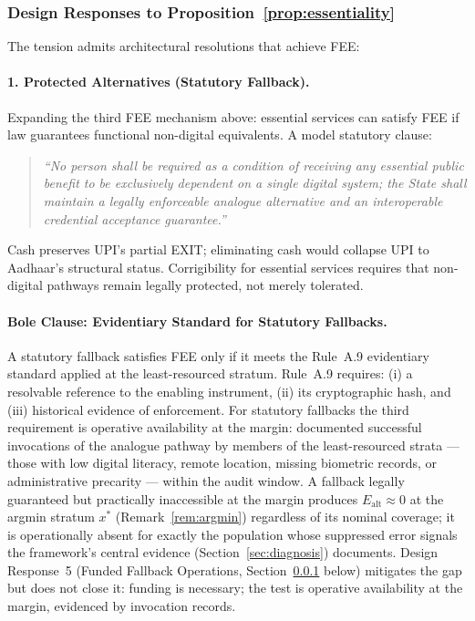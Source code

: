 \documentclass{article}
\begin{document}
\subsubsection{Design Responses to Proposition~\ref{prop:essentiality}}
\label{subsubsec:arch-responses}

The tension admits architectural resolutions that achieve FEE:

\paragraph{1. Protected Alternatives (Statutory Fallback).} Expanding the third FEE mechanism above: essential services can satisfy FEE if law guarantees functional non-digital equivalents. A model statutory clause:

\begin{quote}
\textit{``No person shall be required as a condition of receiving any essential public benefit to be exclusively dependent on a single digital system; the State shall maintain a legally enforceable analogue alternative and an interoperable credential acceptance guarantee.''}
\end{quote}

Cash preserves UPI's partial EXIT; eliminating cash would collapse UPI to Aadhaar's structural status. Corrigibility for essential services requires that non-digital pathways remain legally protected, not merely tolerated.

\paragraph{Bole Clause: Evidentiary Standard for Statutory Fallbacks.} A statutory fallback satisfies FEE only if it meets the Rule~A.9 evidentiary standard applied at the least-resourced stratum. Rule~A.9 requires: (i) a resolvable reference to the enabling instrument, (ii) its cryptographic hash, and (iii) historical evidence of enforcement. For statutory fallbacks the third requirement is operative availability at the margin: documented successful invocations of the analogue pathway by members of the least-resourced strata --- those with low digital literacy, remote location, missing biometric records, or administrative precarity --- within the audit window. A fallback legally guaranteed but practically inaccessible at the margin produces $E_{\text{alt}} \approx 0$ at the argmin stratum $x^*$ (Remark~\ref{rem:argmin}) regardless of its nominal coverage; it is operationally absent for exactly the population whose suppressed error signals the framework's central evidence (Section~\ref{sec:diagnosis}) documents. Design Response~5 (Funded Fallback Operations, Section~\ref{subsubsec:arch-responses} below) mitigates the gap but does not close it: funding is necessary; the test is operative availability at the margin, evidenced by invocation records.
\end{document}
